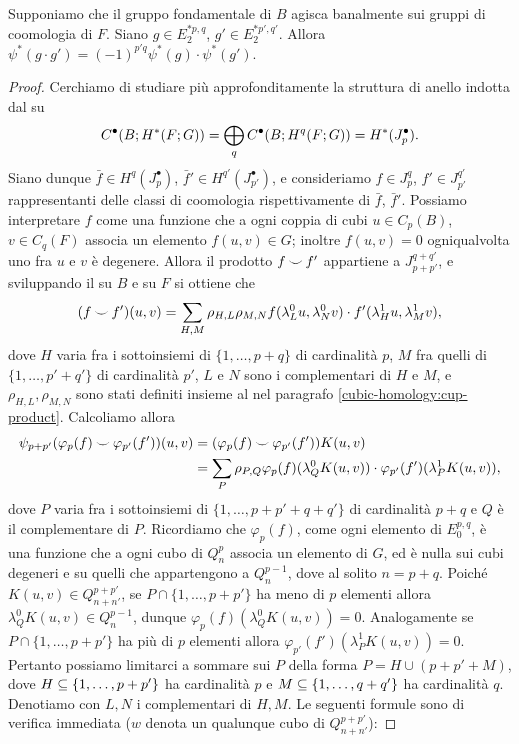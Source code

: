 \begin{proposition}
Supponiamo che il gruppo fondamentale di $B$ agisca banalmente sui gruppi di coomologia di $F$. Siano $g\in E^{\ast p,q}_2$, $g'\in E^{\ast p',q'}_2$. Allora $\psi^*(g\cdot g')=(-1)^{p'q}\psi^*(g)\cdot\psi^*(g')$.
\end{proposition}
\begin{proof}
Cerchiamo di studiare più approfonditamente la struttura di anello indotta dal \cupproduct{} su 
$$
C^\bullet(B;H^*(F;G))=\bigoplus_qC^\bullet(B;H^q(F;G))=H^*(J^\bullet_p).
$$
Siano dunque $\bar{f}\in H^q(J^\bullet_p)$, $\bar{f}'\in H^{q'}(J^\bullet_{p'})$, e consideriamo $f\in J^q_p$, $f'\in J^{q'}_{p'}$ rappresentanti delle classi di coomologia rispettivamente di $\bar{f}$, $\bar{f}'$. Possiamo interpretare $f$ come una funzione che a ogni coppia di cubi $u\in C_p(B)$, $v\in C_q(F)$ associa un elemento $f(u,v)\in G$; inoltre $f(u,v)=0$ ogniqualvolta uno fra $u$ e $v$ è degenere. Allora il prodotto $f\mathbin{\smile} f'$ appartiene a $J^{q+q'}_{p+p'}$, e sviluppando il \cupproduct{} su $B$ e su $F$ si ottiene che
$$
(f\mathbin{\smile} f')(u,v)=\sum_{H,M}\rho_{H,L}\rho_{M,N}f(\lambda^0_Lu,\lambda^0_Nv)\cdot f'(\lambda^1_Hu,\lambda^1_Mv),
$$
dove $H$ varia fra i sottoinsiemi di $\{1,\ldots,p+q\}$ di cardinalità $p$, $M$ fra quelli di $\{1,\ldots,p'+q'\}$ di cardinalità $p'$, $L$ e $N$ sono i complementari di $H$ e $M$, e $\rho_{H,L},\rho_{M,N}$ sono stati definiti insieme al \cupproduct{} nel paragrafo \ref{cubic-homology:cup-product}. Calcoliamo allora
\begin{align*}
\psi_{p+p'}(\varphi_p(f)\mathbin{\smile}\varphi_{p'}(f'))(u,v)&=(\varphi_p(f)\mathbin{\smile}\varphi_{p'}(f'))K(u,v)\\
&=\sum_P\rho_{P,Q}\varphi_p(f)(\lambda^0_QK(u,v))\cdot\varphi_{p'}(f')(\lambda^1_PK(u,v)),
\end{align*}
dove $P$ varia fra i sottoinsiemi di $\{1,\ldots,p+p'+q+q'\}$ di cardinalità $p+q$ e $Q$ è il complementare di $P$. Ricordiamo che $\varphi_p(f)$, come ogni elemento di $E^{p,q}_0$, è una funzione che a ogni cubo di $Q^p_n$ associa un elemento di $G$, ed è nulla sui cubi degeneri e su quelli che appartengono a $Q^{p-1}_n$, dove al solito $n=p+q$. Poiché $K(u,v)\in Q^{p+p'}_{n+n'}$, se $P\cap\{1,\ldots,p+p'\}$ ha meno di $p$ elementi allora $\lambda^0_QK(u,v)\in Q^{p-1}_{n}$, dunque $\varphi_{p}(f)(\lambda^0_QK(u,v))=0$. Analogamente se $P\cap\{1,\ldots,p+p'\}$ ha più di $p$ elementi allora $\varphi_{p'}(f')(\lambda^1_PK(u,v))=0$. Pertanto possiamo limitarci a sommare sui $P$ della forma $P=H\cup(p+p'+M)$, dove $H\subseteq\{1,\ldots,p+p'\}$ ha cardinalità $p$ e $M\subseteq\{1,\ldots,q+q'\}$ ha cardinalità $q$. Denotiamo con $L,N$ i complementari di $H,M$. Le seguenti formule sono di verifica immediata ($w$ denota un qualunque cubo di $Q^{p+p'}_{n+n'}$):

\end{proof}
